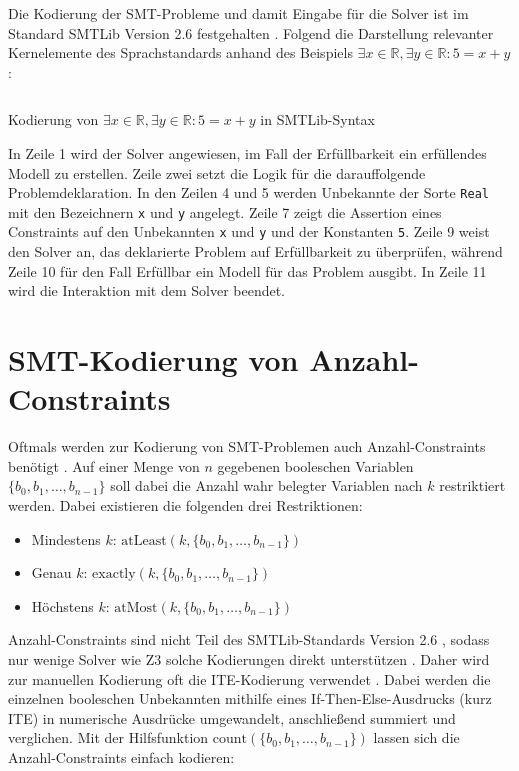 Die Kodierung der SMT-Probleme und damit Eingabe für die Solver ist im Standard SMTLib Version 2.6 festgehalten \cite{smtlib}.
Folgend die Darstellung relevanter Kernelemente des Sprachstandards anhand des Beispiels
$\exists x \in \mathbb{R}, \exists y \in \mathbb{R}: 5 = x + y$:

\begin{listing}[H]
    \inputminted[linenos=true]{bash}{Code/SMT/SMTLibSimple.smt2}
    \caption{Kodierung von $\exists x \in \mathbb{R}, \exists y \in \mathbb{R}: 5 = x + y$ in SMTLib-Syntax}
    \label{listing:smtlibsimple}
\end{listing}

In Zeile 1 wird der Solver angewiesen, im Fall der Erfüllbarkeit ein erfüllendes Modell zu erstellen.
Zeile zwei setzt die Logik für die darauffolgende Problemdeklaration.
In den Zeilen 4 und 5 werden Unbekannte der Sorte \texttt{Real} mit den Bezeichnern \texttt{x} und \texttt{y} angelegt.
Zeile 7 zeigt die Assertion eines Constraints auf den Unbekannten \texttt{x} und \texttt{y} und der Konstanten \texttt{5}.
Zeile 9 weist den Solver an, das deklarierte Problem auf Erfüllbarkeit zu überprüfen, während Zeile 10 für den Fall Erfüllbar ein Modell für das Problem ausgibt.
In Zeile 11 wird die Interaktion mit dem Solver beendet.

\section{SMT-Kodierung von Anzahl-Constraints}
\label{sec:smtcardinality}
Oftmals werden zur Kodierung von SMT-Problemen auch Anzahl-Constraints benötigt \cite{kovasznai}.
Auf einer Menge von $n$ gegebenen booleschen Variablen $\{b_0, b_1, \ldots, b_{n-1}\}$ soll dabei die Anzahl wahr belegter Variablen nach $k$ restriktiert werden.
Dabei existieren die folgenden drei Restriktionen:
\begin{itemize}
    \item Mindestens $k$: $\text{atLeast}(k, \{b_0, b_1, \ldots, b_{n-1}\})$
    \item Genau $k$: $\text{exactly}(k, \{b_0, b_1, \ldots, b_{n-1}\})$
    \item Höchstens $k$: $\text{atMost}(k, \{b_0, b_1, \ldots, b_{n-1}\})$
\end{itemize}

Anzahl-Constraints sind nicht Teil des SMTLib-Standards Version 2.6 \cite{smtlib}, sodass nur wenige Solver wie Z3 solche Kodierungen direkt unterstützen \cite{z3Cardinality}.
Daher wird zur manuellen Kodierung oft die ITE-Kodierung verwendet \cite{kovasznai}.
Dabei werden die einzelnen booleschen Unbekannten mithilfe eines If-Then-Else-Ausdrucks (kurz ITE) in numerische Ausdrücke umgewandelt, anschließend summiert und verglichen.
Mit der Hilfsfunktion $\text{count}(\{b_0, b_1, \ldots, b_{n-1}\})$ lassen sich die Anzahl-Constraints einfach kodieren:

